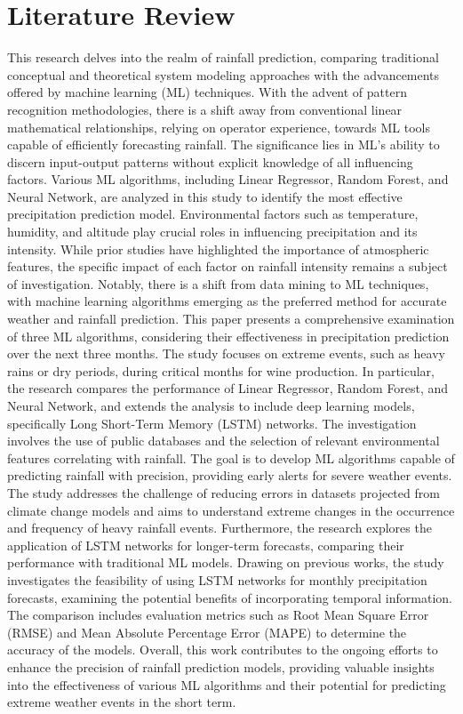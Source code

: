 \documentclass[conference, onecolumn]{IEEEtran}
\begin{document}
\section{\textbf{Literature Review}}
This research delves into the realm of rainfall prediction, comparing traditional conceptual and theoretical system modeling approaches with the advancements offered by machine learning (ML) techniques. With the advent of pattern recognition methodologies, there is a shift away from conventional linear mathematical relationships, relying on operator experience, towards ML tools capable of efficiently forecasting rainfall. The significance lies in ML's ability to discern input-output patterns without explicit knowledge of all influencing factors. Various ML algorithms, including Linear Regressor, Random Forest, and Neural Network, are analyzed in this study to identify the most effective precipitation prediction model. Environmental factors such as temperature, humidity, and altitude play crucial roles in influencing precipitation and its intensity. While prior studies have highlighted the importance of atmospheric features, the specific impact of each factor on rainfall intensity remains a subject of investigation. Notably, there is a shift from data mining to ML techniques, with machine learning algorithms emerging as the preferred method for accurate weather and rainfall prediction. This paper presents a comprehensive examination of three ML algorithms, considering their effectiveness in precipitation prediction over the next three months. The study focuses on extreme events, such as heavy rains or dry periods, during critical months for wine production. In particular, the research compares the performance of Linear Regressor, Random Forest, and Neural Network, and extends the analysis to include deep learning models, specifically Long Short-Term Memory (LSTM) networks. The investigation involves the use of public databases and the selection of relevant environmental features correlating with rainfall. The goal is to develop ML algorithms capable of predicting rainfall with precision, providing early alerts for severe weather events. The study addresses the challenge of reducing errors in datasets projected from climate change models and aims to understand extreme changes in the occurrence and frequency of heavy rainfall events. Furthermore, the research explores the application of LSTM networks for longer-term forecasts, comparing their performance with traditional ML models. Drawing on previous works, the study investigates the feasibility of using LSTM networks for monthly precipitation forecasts, examining the potential benefits of incorporating temporal information. The comparison includes evaluation metrics such as Root Mean Square Error (RMSE) and Mean Absolute Percentage Error (MAPE) to determine the accuracy of the models. Overall, this work contributes to the ongoing efforts to enhance the precision of rainfall prediction models, providing valuable insights into the effectiveness of various ML algorithms and their potential for predicting extreme weather events in the short term.
\end{document}
